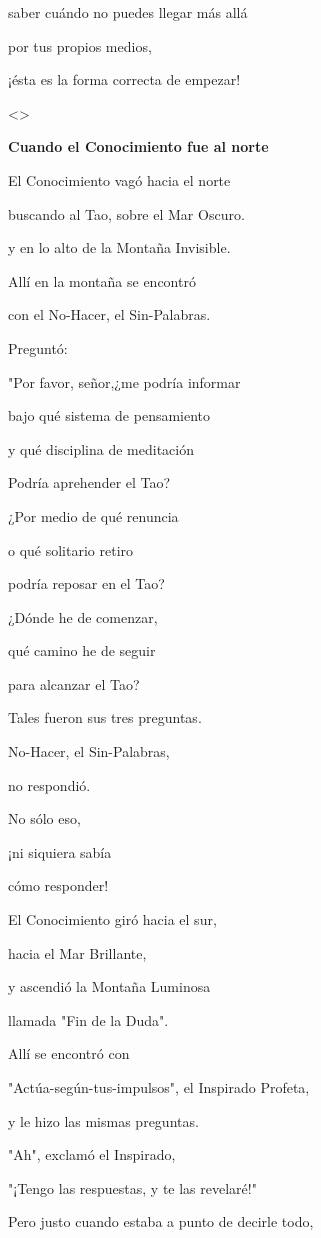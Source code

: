 saber cuándo no puedes llegar más allá

por tus propios medios,

¡ésta es la forma correcta de empezar!

\textless\textgreater{}

\textbf{{Cuando el Conocimiento fue al norte}}

El Conocimiento vagó hacia el norte

buscando al Tao, sobre el Mar Oscuro.

y en lo alto de la Montaña Invisible.

Allí en la montaña se encontró

con el No-Hacer, el Sin-Palabras.

Preguntó:

"Por favor, señor,¿me podría informar

bajo qué sistema de pensamiento

y qué disciplina de meditación

Podría aprehender el Tao?

¿Por medio de qué renuncia

o qué solitario retiro

podría reposar en el Tao?

¿Dónde he de comenzar,

qué camino he de seguir

para alcanzar el Tao?

Tales fueron sus tres preguntas.

No-Hacer, el Sin-Palabras,

no respondió.

No sólo eso,

¡ni siquiera sabía

cómo responder!

El Conocimiento giró hacia el sur,

hacia el Mar Brillante,

y ascendió la Montaña Luminosa

llamada "Fin de la Duda".

Allí se encontró con

"Actúa-según-tus-impulsos", el Inspirado Profeta,

y le hizo las mismas preguntas.

"Ah", exclamó el Inspirado,

"¡Tengo las respuestas, y te las revelaré!"

Pero justo cuando estaba a punto de decirle todo,

